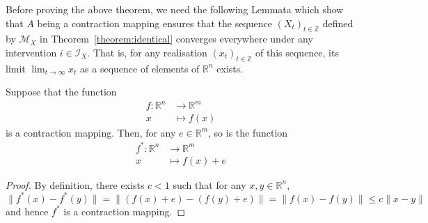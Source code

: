 \medskip

Before proving the above theorem, we need the following Lemmata which show that $A$ being a contraction mapping ensures that the sequence $(X_t)_{t\in\mathbb{Z}}$ defined by $\mathcal{M}_X$ in Theorem~\ref{theorem:identical} converges everywhere under any intervention $i\in\mathcal{I}_X$.
That is, for any realisation $(x_t)_{t\in\mathbb{Z}}$ of this sequence, its limit $\lim_{t\rightarrow \infty}x_t$ as a sequence of elements of $\mathbb{R}^n$ exists.

\medskip

\begin{lemma}\label{lemma:contraction_add}
Suppose that the function
\begin{align*}
f: \mathbb{R}^n & \rightarrow \mathbb{R}^m \\
 x & \mapsto f(x)
\end{align*}
is a contraction mapping.
Then, for any $e \in \mathbb{R}^m$, so is the function
\begin{align*}
f^*: \mathbb{R}^n & \rightarrow \mathbb{R}^m \\
 x & \mapsto f(x) + e
\end{align*}
\end{lemma}

\medskip

\begin{proof}
By definition, there exists $c<1$ such that for any $x,y\in \mathbb{R}^n$,
\[
\| f^*(x)-f^*(y) \| = \| (f(x)+e)-(f(y)+e) \| = \| f(x)-f(y) \| \leq c \| x - y \|
\]
and hence $f^*$ is a contraction mapping.
\end{proof}

\medskip

